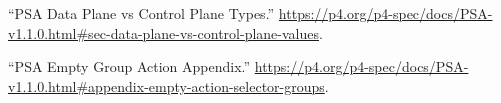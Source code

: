 \documentclass[11pt]{article}
\begin{document}
{{\begin{thebibliography}{40}
\mdbibitemlabel{{}[25]}\textquotedblleft{}PSA Data Plane vs Control Plane Types.\textquotedblright{} \href{https://p4.org/p4-spec/docs/PSA-v1.1.0.html\%23sec-data-plane-vs-control-plane-values}{{\ttfamily https://\hspace{0pt}p4.\hspace{0pt}org/\hspace{0pt}p4-\hspace{0pt}spec/\hspace{0pt}docs/\hspace{0pt}PSA-\hspace{0pt}v1.\hspace{0pt}1.\hspace{0pt}0.\hspace{0pt}html\#\hspace{0pt}sec-\hspace{0pt}data-\hspace{0pt}plane-\hspace{0pt}vs-\hspace{0pt}control-\hspace{0pt}plane-\hspace{0pt}values}}.\label{psatranslation}%

\mdbibitemlabel{{}[26]}\textquotedblleft{}PSA Empty Group Action Appendix.\textquotedblright{} \href{https://p4.org/p4-spec/docs/PSA-v1.1.0.html\%23appendix-empty-action-selector-groups}{{\ttfamily https://\hspace{0pt}p4.\hspace{0pt}org/\hspace{0pt}p4-\hspace{0pt}spec/\hspace{0pt}docs/\hspace{0pt}PSA-\hspace{0pt}v1.\hspace{0pt}1.\hspace{0pt}0.\hspace{0pt}html\#\hspace{0pt}appendix-\hspace{0pt}empty-\hspace{0pt}action-\hspace{0pt}selector-\hspace{0pt}groups}}.\label{psaemptygroupactionappendix}%


\end{thebibliography}}}
\end{document}

